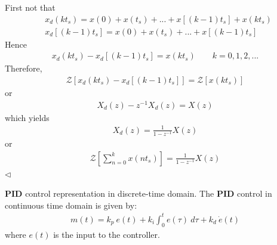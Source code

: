 \documentclass[12pt,a4paper,oneside]{book}
\begin{document}
\begin{onehalfspace}
\begin{example}
First not that
\begin{equation*}
	\begin{split}
		&x_d(kt_s) = x(0)+x(t_s)+...+x\left[(k-1)t_s\right]+x(kt_s) \\[6pt]
		&x_d\left[(k-1)t_s\right] = x(0)+x(t_s)+...+x\left[(k-1)t_s\right]
	\end{split}
\end{equation*} 
Hence 
\begin{equation*}
	\begin{split}
		x_d(kt_s) - x_d\left[(k-1)t_s\right] = x(kt_s) \quad\quad k=0,1,2,...
	\end{split}
\end{equation*} 
Therefore,
\begin{equation*}
	\begin{split}
		\mathcal{Z} \left[ x_d(kt_s) - x_d\left[(k-1)t_s\right] \right] = \mathcal{Z} \left[ x(kt_s) \right]
	\end{split}
\end{equation*}
or
\begin{equation*}
	\begin{split}
		X_d(z)-z^{-1}X_d(z) = X(z)
	\end{split}
\end{equation*}
which yields 
\begin{equation*}
	\begin{split}
		X_d(z) = \frac{1}{1-z^{-1}}X(z)
	\end{split}
\end{equation*}
or 
\begin{equation}\label{zsum}
	\begin{split}
		\mathcal{Z} \left[ \sum_{n=0}^{k}x(nt_s) \right] = \frac{1}{1-z^{-1}}X(z)
	\end{split}
\end{equation}
$\triangleleft$ \end{example}

\begin{example}\label{PIDinDTD}
\textbf{PID} control representation in discrete-time domain. The \textbf{PID} 
control in 
continuous time domain is given by:
\begin{equation}
	\begin{split}
		m(t) = k_p \ e(t) + k_i \int_{0}^{t} e(\tau)\ d\tau +k_d \ \dot{e}(t)
	\end{split}
\end{equation}
where $e(t)$ is the input to the controller.


\end{example}
\end{onehalfspace}
\end{document}
